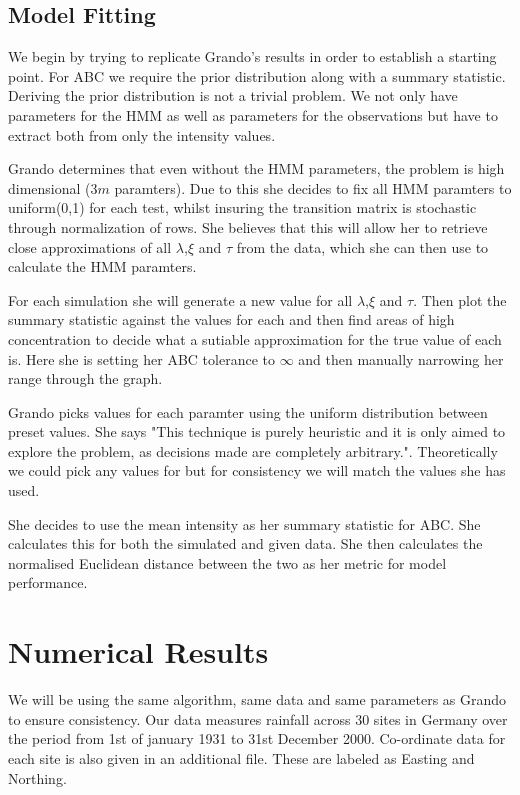 \subsection{Model Fitting}
We begin by trying to replicate Grando's results in order to establish a starting point. For ABC we require the prior distribution along with a summary statistic. Deriving the prior distribution is not a trivial problem. We not only have parameters for the HMM as well as parameters for the observations but have to  extract both from only the intensity values. 

Grando determines that even without the HMM parameters, the problem is high dimensional (3$m$ paramters). Due to this she decides to fix all HMM paramters to uniform(0,1) for each test, whilst insuring the transition matrix is stochastic through normalization of rows. She believes that this will allow her to retrieve close approximations of all $\lambda$,$\xi$ and $\tau$ from the data, which she can then use to calculate the HMM paramters. 

For each simulation she will generate a new value for all $\lambda$,$\xi$ and $\tau$. Then plot the summary statistic against the values for each and then find areas of high concentration to decide what a sutiable approximation for the true value of each is. Here she is setting her ABC tolerance to $\infty$ and then manually narrowing her range through the graph.

Grando picks values for each paramter using the uniform distribution between preset values. She says "This technique is purely heuristic and it is only aimed to explore the problem, as decisions made are completely arbitrary.". Theoretically we could pick any values for  but for consistency we will match the values she has used.  

She decides to use the mean intensity as her summary statistic for ABC. She calculates this for both the simulated and given data. She then calculates the normalised Euclidean distance between the two as her metric for model performance.


\section{Numerical Results}
We will be using the same algorithm, same data and same parameters as Grando to ensure consistency. Our data measures rainfall across 30 sites in Germany over the period from 1st of january 1931 to 31st December 2000. Co-ordinate data for each site is also given in an additional file. These are labeled as Easting and Northing. 

